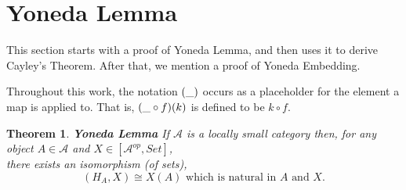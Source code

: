 \documentclass[a4paper]{article}
\newtheorem{theorem}{Theorem}[section]
\theoremstyle{definition}
\begin{document}
\section{Yoneda Lemma} %
This section starts with a proof of Yoneda Lemma, and then uses it to derive Cayley's Theorem.
After that, we mention a proof of Yoneda Embedding.

Throughout this work, the notation $(\string _)$ occurs as a placeholder for the element a map is applied to.
		That is, $(\string _ \circ f)(k)$ is defined to be $k \circ f$.
		\begin{theorem}{\textbf{Yoneda Lemma}} %
			\setcounter{equation}{0}
			If $\mathcal{A} $ is a locally small category then, for any object $A \in \mathcal{A} $
			and $X \in [ \mathcal{A}^{op},Set]$,\\ there exists an isomorphism
			(of sets),
			\begin{equation} [ \mathcal{A} ^{op},Set ](H_A,X)\cong X(A) \text{ which is natural in } A \text{ and } X.\end{equation}
		\end{theorem}
\end{document}
